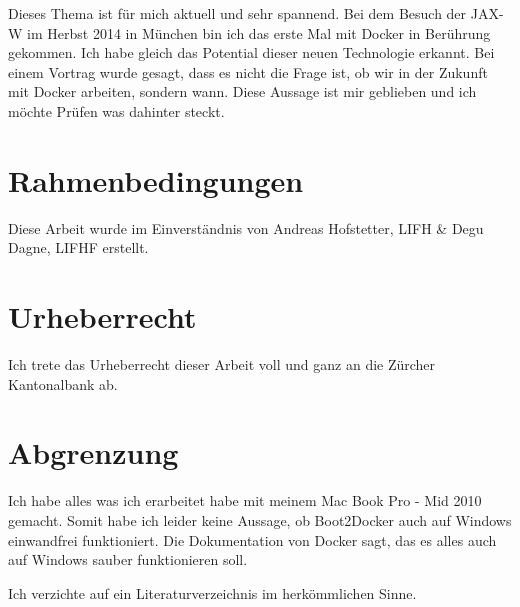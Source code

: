 Dieses Thema ist für mich aktuell und sehr spannend.
Bei dem Besuch der JAX-W im Herbst 2014 in München bin ich das erste Mal mit Docker
in Berührung gekommen. Ich habe gleich das Potential dieser neuen
Technologie erkannt. Bei einem Vortrag wurde gesagt, dass es nicht die
Frage ist, ob wir in der Zukunft mit Docker arbeiten, sondern wann. Diese Aussage
ist mir geblieben und ich möchte Prüfen was dahinter steckt.

\section{Rahmenbedingungen}

Diese Arbeit wurde im Einverständnis von Andreas Hofstetter, LIFH \& Degu Dagne, LIFHF
erstellt.

\section{Urheberrecht}

Ich trete das Urheberrecht dieser Arbeit voll und ganz an die Zürcher Kantonalbank ab.

\section{Abgrenzung}

Ich habe alles was ich erarbeitet habe mit meinem Mac Book Pro - Mid 2010 gemacht.
Somit habe ich leider keine Aussage, ob Boot2Docker auch auf Windows einwandfrei funktioniert.
Die Dokumentation von Docker sagt, das es alles auch auf Windows sauber funktionieren soll.

Ich verzichte auf ein Literaturverzeichnis im herkömmlichen Sinne.
